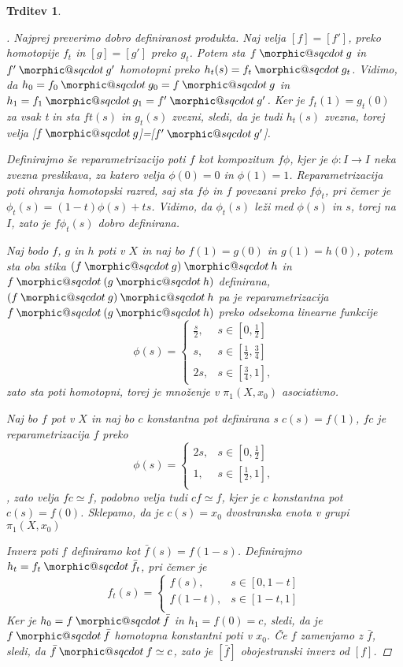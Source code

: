 \documentclass[a4paper,12pt]{article}
\makeatletter
\DeclareRobustCommand{\sqcdot}{\mathbin{\mathpalette\morphic@sqcdot\relax}}
\newcommand{\morphic@sqcdot}[2]{%
\sbox\z@{$\m@th#1\centerdot$}%
\ht\z@=.33333\ht\z@
\vcenter{\box\z@}%
}
\theoremstyle{definition}
\theoremstyle{plain}
\theoremstyle{definition}
\theoremstyle{plain}
\newtheorem{trditev}{Trditev}
\theoremstyle{plain}
\theoremstyle{plain}
\theoremstyle{plain}
\newenvironment{dokaz}{\begin{proof}[\bfseries\upshape\proofname]}{\end{proof}}
\makeatother
\begin{document}
\begin{trditev}
\begin{dokaz}
    Najprej preverimo dobro definiranost produkta. Naj velja $[f]=[f']$, preko homotopije $f_t$ in $[g]=[g']$ preko $g_t$. Potem sta $f\sqcdot g$ in $f'\sqcdot g'$ homotopni preko
    $h_t(s) =f_t \sqcdot g_t$. Vidimo, da $h_0=f_0 \sqcdot g_0=f \sqcdot g$ in $h_1=f_1 \sqcdot g_1=f'\sqcdot g'$. Ker je $f_t(1)=g_t(0)$ za vsak t in sta $ft(s)$ in $g_t(s)$ zvezni, sledi, da je tudi $h_t(s)$ zvezna, torej velja [$f\sqcdot g$]=[$f'\sqcdot g'$].

    Definirajmo še \textit{reparametrizacijo} poti $f$ kot kompozitum $f 
    \phi$, kjer je $\phi: I \rightarrow I$ neka zvezna preslikava, za 
    katero velja $\phi(0)= 0$ in $\phi(1)=1$. Reparametrizacija poti 
    ohranja homotopski razred, saj sta $f\phi$ in $f$ povezani preko 
    $f\phi_t$, pri čemer je $\phi_t(s)=(1-t)\phi(s)+ts$. Vidimo, da 
    $\phi_t(s)$ leži med $\phi(s)$ in $s$, torej na $I$, zato je 
    $f\phi_t(s)$ dobro definirana.

    Naj bodo $f$, $g$ in $h$ poti v $X$ in naj bo $f(1)=g(0)$ in 
    $g(1)=h(0)$, potem sta oba stika $(f\sqcdot g) \sqcdot h$ in 
    $f\sqcdot (g \sqcdot h)$ definirana, $(f\sqcdot g) \sqcdot h$ pa je
     reparametrizacija $f\sqcdot (g \sqcdot h)$ preko odsekoma linearne 
     funkcije
    $$
    \phi(s)=\begin{cases}
        \frac{s}{2}, &s \in [0,\frac{1}{2}] \\
        s, & s \in [\frac{1}{2},\frac{3}{4}]\\
        2s, & s \in [\frac{3}{4},1],
    \end{cases}
    $$ zato sta poti homotopni, torej je množenje v $\pi_1(X,x_0)$ asociativno.

    Naj bo $f$ pot v $X$ in naj bo $c$ konstantna pot definirana s $c(s)=f(1)$, $fc$ je reparametrizacija $f$ preko 
    $$\phi(s)=\begin{cases}
        2s, &s \in [0,\frac{1}{2}] \\
        1, & s \in [\frac{1}{2},1],\\
        \end{cases}
    $$, zato velja $fc\simeq f$, podobno velja tudi  $cf\simeq f$, kjer je $c$ konstantna pot $c(s)=f(0)$. Sklepamo, da je $c(s)=x_0$ dvostranska enota v grupi  $\pi_1(X,x_0)$

    Inverz poti $f$ definiramo kot $\bar{f}(s)=f(1-s)$. Definirajmo $h_t=f_t\sqcdot \bar{f_t}$, pri čemer je 
    $$
    f_t(s)=
    \begin{cases}
        f(s), &s \in [0,1-t] \\
        f(1-t), & s \in [1-t,1] \\
        \end{cases}
$$
Ker je $h_0=f\sqcdot \bar{f}$ in $h_1=f(0)=c$, sledi, da je $f\sqcdot \bar{f}$ homotopna konstantni poti v $x_0$. Če $f$ zamenjamo z $\bar{f}$, sledi, da $\bar{f}\sqcdot f\simeq c$, zato je $[\bar{f}]$ obojestranski inverz od $[f]$.
\end{dokaz}


\end{trditev}
\end{document}
